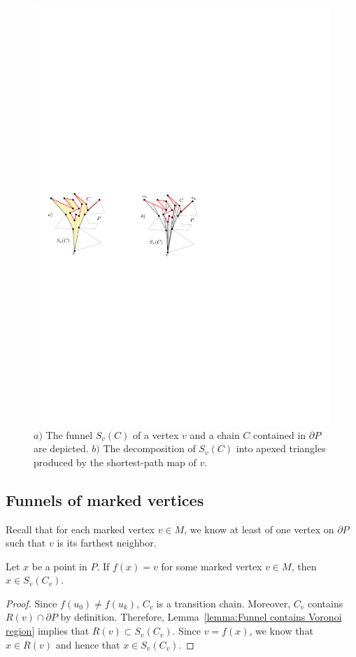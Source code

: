 \documentclass[a4paper,UKenglish]{lipics}
\newcommand{\fn}[2]{\ensuremath{S_{\scriptscriptstyle #1}(#2)}}
\newcommand{\ff}[1]{\ensuremath{f(#1)}}
\begin{document}
\begin{figure}[tb]
\centering
\includegraphics{img/Funnel.pdf}
\caption{\small $a)$ The funnel $\fn{v}{C}$ of a vertex $v$ and a chain $C$ contained in $\partial P$ are depicted.
$b)$ The decomposition of $\fn{v}{C}$ into apexed triangles produced by the shortest-path map of $v$.}
\label{fig:Funnels and decomposition}
\end{figure}

\subsection{Funnels of marked vertices}
Recall that for each marked vertex $v\in M$, we know at least of one vertex on $\partial P$ such that $v$ is its farthest neighbor.

\begin{lemma}\label{lemma:Farthest points from marked are in funnel}
Let $x$ be a point in $P$. If $\ff{x} = v$ for some marked vertex $v\in M$, then $x\in \fn{v}{C_v}$.
\end{lemma}
\begin{proof}
Since $\ff{u_0} \neq \ff{u_k}$, $C_v$ is a transition chain. Moreover, $C_v$ contains $R(v)\cap \partial P$ by definition. Therefore, Lemma~\ref{lemma:Funnel contains Voronoi region} implies that $R(v)\subset \fn{v}{C_v}$.
Since $v = \ff{x}$, we know that $x\in R(v)$ and hence that $x \in \fn{v}{C_v}$. 
\end{proof}
\end{document}
